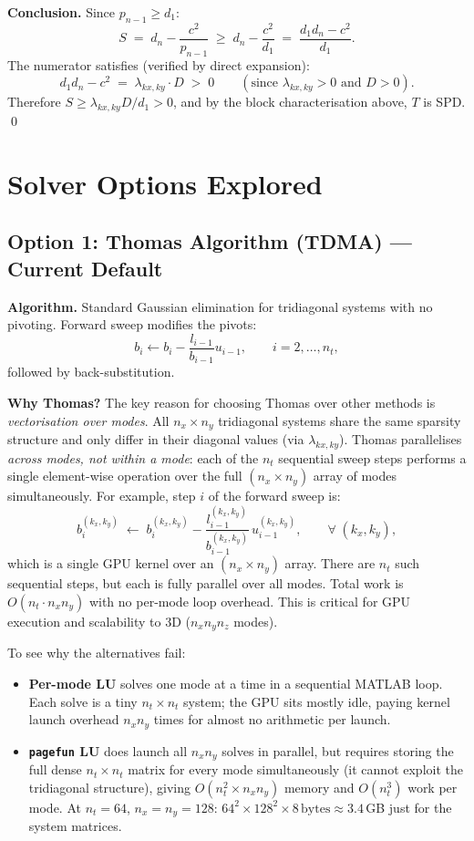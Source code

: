 \documentclass[11pt]{article}
\newcommand{\lxy}{\lambda_{kx,ky}}
\begin{document}
\medskip\noindent
\textbf{Conclusion.}
Since $p_{n-1} \geq d_1$:
\[
  S \;=\; d_n - \frac{c^2}{p_{n-1}}
    \;\geq\; d_n - \frac{c^2}{d_1}
    \;=\; \frac{d_1 d_n - c^2}{d_1}.
\]
The numerator satisfies (verified by direct expansion):
\[
  d_1 d_n - c^2 \;=\; \lxy \cdot D \;>\; 0
  \qquad (\text{since } \lxy > 0 \text{ and } D > 0).
\]
Therefore $S \geq \lxy D / d_1 > 0$, and by the block characterisation above, $T$ is SPD. \qed

\section{Solver Options Explored}

\subsection{Option 1: Thomas Algorithm (TDMA) --- Current Default}

\textbf{Algorithm.} Standard Gaussian elimination for tridiagonal systems with no pivoting.
Forward sweep modifies the pivots:
\[
  b_i \leftarrow b_i - \frac{l_{i-1}}{b_{i-1}} u_{i-1}, \qquad i = 2, \ldots, n_t,
\]
followed by back-substitution.

\textbf{Why Thomas?}
The key reason for choosing Thomas over other methods is \textit{vectorisation over modes}.
All $n_x \times n_y$ tridiagonal systems share the same sparsity structure and only differ
in their diagonal values (via $\lxy$).
Thomas parallelises \emph{across modes, not within a mode}: each of the $n_t$ sequential
sweep steps performs a single element-wise operation over the full $(n_x \times n_y)$ array
of modes simultaneously.
For example, step $i$ of the forward sweep is:
\[
  b_i^{(k_x, k_y)} \;\leftarrow\;
  b_i^{(k_x,k_y)} - \frac{l_{i-1}^{(k_x,k_y)}}{b_{i-1}^{(k_x,k_y)}} \, u_{i-1}^{(k_x,k_y)},
  \qquad \forall\; (k_x, k_y),
\]
which is a single GPU kernel over an $(n_x \times n_y)$ array.
There are $n_t$ such sequential steps, but each is fully parallel over all modes.
Total work is $O(n_t \cdot n_x n_y)$ with no per-mode loop overhead.
This is critical for GPU execution and scalability to 3D ($n_x n_y n_z$ modes).

To see why the alternatives fail:
\begin{itemize}
  \item \textbf{Per-mode LU} solves one mode at a time in a sequential MATLAB loop.
        Each solve is a tiny $n_t \times n_t$ system; the GPU sits mostly idle, paying
        kernel launch overhead $n_x n_y$ times for almost no arithmetic per launch.
  \item \textbf{\texttt{pagefun} LU} does launch all $n_x n_y$ solves in parallel, but
        requires storing the full dense $n_t \times n_t$ matrix for every mode
        simultaneously (it cannot exploit the tridiagonal structure), giving
        $O(n_t^2 \times n_x n_y)$ memory and $O(n_t^3)$ work per mode.
        At $n_t = 64$, $n_x = n_y = 128$: $64^2 \times 128^2 \times 8\,\text{bytes} \approx 3.4$\,GB
        just for the system matrices.
\end{itemize}
\end{document}
